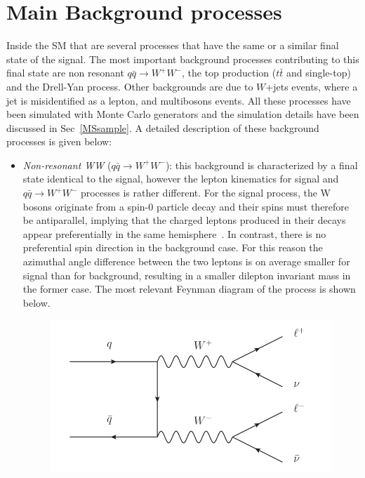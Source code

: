 \section{Main Background processes}
\label{anbkg}
Inside the SM that are several processes that have the same or a similar final state of the signal. The most important background processes contributing to this final state are non resonant $q\bar{q} \to W^+ W^-$, the top production ($t\bar{t}$ and single-top) and the Drell-Yan process. 
Other backgrounds are due to $W$+jets events, where a jet is misidentified as a lepton, and multibosons events. 
All these processes have been simulated with Monte Carlo generators and the simulation details have been discussed in Sec~\ref{MSsample}.
A detailed description of these background processes is given below:
\begin{itemize}
\item \textit{Non-resonant WW} ($q\bar{q} \to W^+ W^-$): this background is characterized by a final state identical to the signal, however the lepton kinematics for signal and $q\bar{q} \to W^+ W^-$ processes is rather different.
For the signal process, the W bosons originate from a spin-0 particle decay
and their spins must therefore be antiparallel, implying that the charged leptons produced 
in their decays appear preferentially in the same hemisphere~\cite{Ellis:2012wg}. In contrast,
there is no preferential spin direction in the background case. For this reason the
azimuthal angle difference between the two leptons is on average smaller for signal
than for background, resulting in a smaller dilepton invariant mass in the former case. The most relevant Feynman diagram of the process is shown below.
\begin{figure}[h]
\centering
\vspace{0.5cm}
\includegraphics[scale= 0.9]{../Cap5/nnr_WW}
\end{figure}

\end{itemize}
